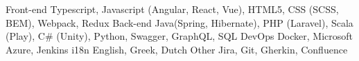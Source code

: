 

\begin{cvskills}
	\cvskill
		{Front-end} %
		{
			Typescript, Javascript (Angular, React, Vue), HTML5, CSS (SCSS, BEM), Webpack, Redux
		} %
	\cvskill
		{Back-end} %
		{
			Java(Spring, Hibernate), PHP (Laravel), Scala (Play), C\# (Unity), Python, Swagger, GraphQL, SQL
		} %
	\cvskill
		{DevOps} %
		{Docker, Microsoft Azure, Jenkins} %
	\cvskill
		{i18n} %
		{English, Greek, Dutch} %
	\cvskill
		{Other} %
		{Jira, Git, Gherkin, Confluence} %
\end{cvskills}
